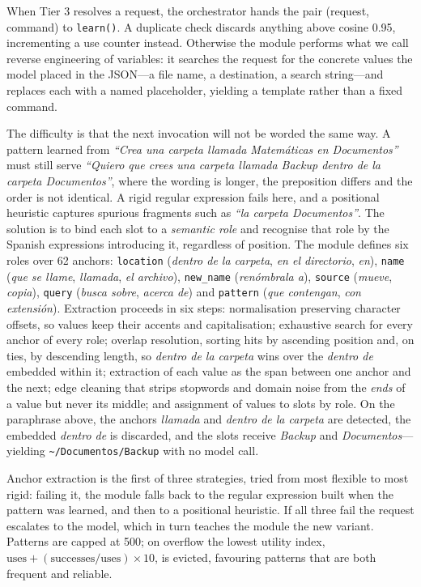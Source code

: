 \documentclass[10pt,a4paper]{article}
\begin{document}
When Tier 3 resolves a request, the orchestrator hands the pair (request, command) to \texttt{learn()}. A duplicate check discards anything above cosine 0.95, incrementing a use counter instead. Otherwise the module performs what we call reverse engineering of variables: it searches the request for the concrete values the model placed in the JSON---a file name, a destination, a search string---and replaces each with a named placeholder, yielding a template rather than a fixed command.

The difficulty is that the next invocation will not be worded the same way. A pattern learned from \textit{``Crea una carpeta llamada Matem\'{a}ticas en Documentos''} must still serve \textit{``Quiero que crees una carpeta llamada Backup dentro de la carpeta Documentos''}, where the wording is longer, the preposition differs and the order is not identical. A rigid regular expression fails here, and a positional heuristic captures spurious fragments such as \textit{``la carpeta Documentos''}. The solution is to bind each slot to a \emph{semantic role} and recognise that role by the Spanish expressions introducing it, regardless of position. The module defines six roles over 62 anchors: \texttt{location} (\textit{dentro de la carpeta}, \textit{en el directorio}, \textit{en}), \texttt{name} (\textit{que se llame}, \textit{llamada}, \textit{el archivo}), \texttt{new\_name} (\textit{ren\'{o}mbrala a}), \texttt{source} (\textit{mueve}, \textit{copia}), \texttt{query} (\textit{busca sobre}, \textit{acerca de}) and \texttt{pattern} (\textit{que contengan}, \textit{con extensi\'{o}n}). Extraction proceeds in six steps: normalisation preserving character offsets, so values keep their accents and capitalisation; exhaustive search for every anchor of every role; overlap resolution, sorting hits by ascending position and, on ties, by descending length, so \textit{dentro de la carpeta} wins over the \textit{dentro de} embedded within it; extraction of each value as the span between one anchor and the next; edge cleaning that strips stopwords and domain noise from the \emph{ends} of a value but never its middle; and assignment of values to slots by role. On the paraphrase above, the anchors \textit{llamada} and \textit{dentro de la carpeta} are detected, the embedded \textit{dentro de} is discarded, and the slots receive \textit{Backup} and \textit{Documentos}---yielding \texttt{\textasciitilde/Documentos/Backup} with no model call.

Anchor extraction is the first of three strategies, tried from most flexible to most rigid: failing it, the module falls back to the regular expression built when the pattern was learned, and then to a positional heuristic. If all three fail the request escalates to the model, which in turn teaches the module the new variant. Patterns are capped at 500; on overflow the lowest utility index, $\mathrm{uses} + (\mathrm{successes}/\mathrm{uses}) \times 10$, is evicted, favouring patterns that are both frequent and reliable.
\end{document}
